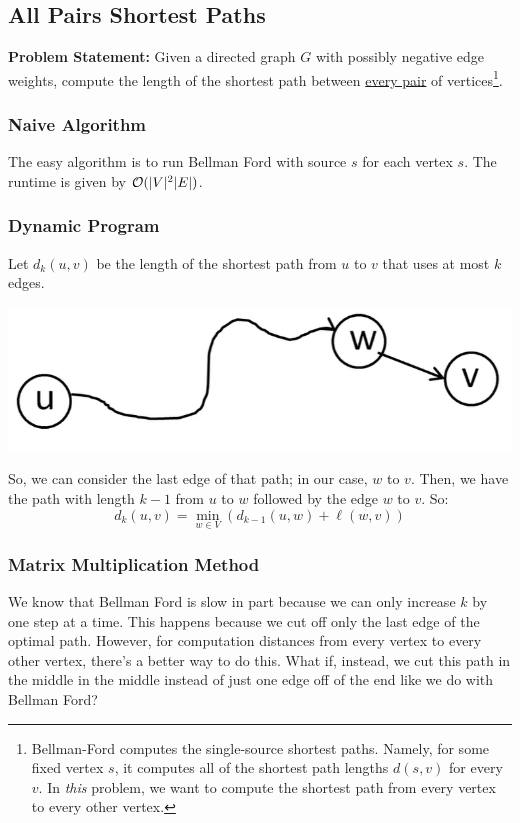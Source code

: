 \documentclass[letterpaper]{article}
\begin{document}
\subsection{All Pairs Shortest Paths}
\textbf{Problem Statement:} Given a directed graph $G$ with possibly negative edge weights, compute the length of the shortest path between \underline{every pair} of vertices\footnote{Bellman-Ford computes the single-source shortest paths. Namely, for some fixed vertex $s$, it computes all of the shortest path lengths $d(s, v)$ for every $v$. In \emph{this} problem, we want to compute the shortest path from every vertex to every other vertex.}.

\subsubsection{Naive Algorithm}
The easy algorithm is to run Bellman Ford with source $s$ for each vertex $s$. The runtime is given by $\mathcal{O}(|V|^2 |E|)$. 

\subsubsection{Dynamic Program}
Let $d_{k}(u, v)$ be the length of the shortest path from $u$ to $v$ that uses at most $k$ edges. 
\begin{center}
    \includegraphics[scale=0.3]{assets/sp.png}
\end{center}
So, we can consider the last edge of that path; in our case, $w$ to $v$. Then, we have the path with length $k - 1$ from $u$ to $w$ followed by the edge $w$ to $v$. So: 
\[d_{k}(u, v) = \min_{w \in V}(d_{k - 1}(u, w) + \ell(w, v))\]

\subsubsection{Matrix Multiplication Method}
We know that Bellman Ford is slow in part because we can only increase $k$ by one step at a time. This happens because we cut off only the last edge of the optimal path. However, for computation distances from every vertex to every other vertex, there's a better way to do this. What if, instead, we cut this path in the middle in the middle instead of just one edge off of the end like we do with Bellman Ford?
\end{document}

